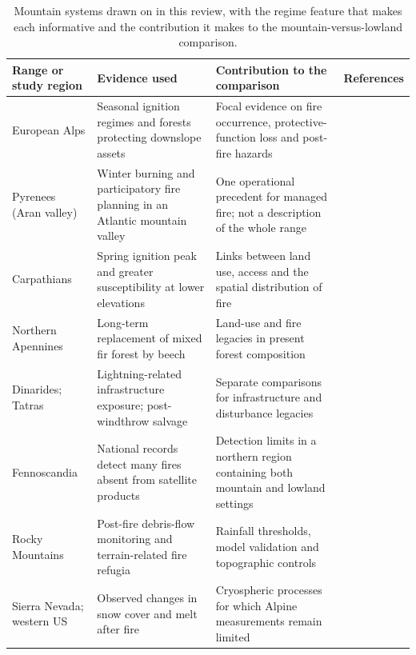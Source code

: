 \documentclass[11pt,a4paper]{article}
\begin{document}
\begin{table}[H]
\centering
\footnotesize
\setlength{\tabcolsep}{4pt}
\renewcommand{\arraystretch}{1.1}
\caption{Mountain systems drawn on in this review, with the regime feature that makes each informative and the contribution it makes to the mountain-versus-lowland comparison.}
\label{tab:ranges}
\begin{tabularx}{\textwidth}{@{}>{\raggedright\arraybackslash}p{2.1cm} >{\raggedright\arraybackslash}p{3.0cm} >{\raggedright\arraybackslash}X >{\raggedright\arraybackslash}p{2.9cm}@{}}
\toprule
\textbf{Range or study region} & \textbf{Evidence used} & \textbf{Contribution to the comparison} & \textbf{References} \\
\midrule
European Alps & Seasonal ignition regimes and forests protecting downslope assets & Focal evidence on fire occurrence, protective-function loss and post-fire hazards & \citep{conedera_characterizing_2018, muller_forest_2020, gehring_shallow_2019} \\
Pyrenees (Aran valley) & Winter burning and participatory fire planning in an Atlantic mountain valley & One operational precedent for managed fire; not a description of the whole range & \citep{oliveres_path_2025} \\
Carpathians & Spring ignition peak and greater susceptibility at lower elevations & Links between land use, access and the spatial distribution of fire & \citep{manczinger_fire_2025} \\
Northern Apennines & Long-term replacement of mixed fir forest by beech & Land-use and fire legacies in present forest composition & \citep{moralesmolino_longterm_2021} \\
Dinarides; Tatras & Lightning-related infrastructure exposure; post-windthrow salvage & Separate comparisons for infrastructure and disturbance legacies & \citep{kyriakopoulos_impact_2023, seben_impact_2024} \\
Fennoscandia & National records detect many fires absent from satellite products & Detection limits in a northern region containing both mountain and lowland settings & \citep{bakke_datadriven_2023} \\
Rocky Mountains & Post-fire debris-flow monitoring and terrain-related fire refugia & Rainfall thresholds, model validation and topographic controls & \citep{rengers_evaluating_2024, rogeau_effect_2018} \\
Sierra Nevada; western US & Observed changes in snow cover and melt after fire & Cryospheric processes for which Alpine measurements remain limited & \citep{micheletty_application_2014, koshkin_wildfire_2022} \\

\end{tabularx}
\end{table}
\end{document}
